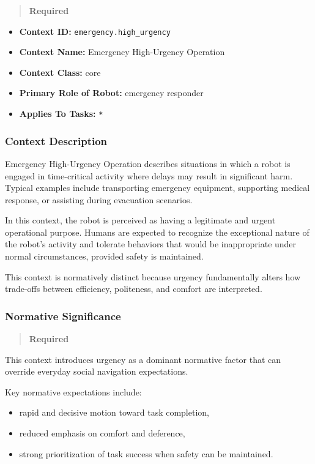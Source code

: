 \documentclass[utf8]{frontiers_suppmat} %
\providecommand{\tightlist}{%
  \setlength{\itemsep}{0pt}\setlength{\parskip}{0pt}}
\begin{document}
\begin{quote}
\textbf{Required}
\end{quote}

\begin{itemize}
\tightlist
\item
  \textbf{Context ID:} \texttt{emergency.high\_urgency}
\item
  \textbf{Context Name:} Emergency High-Urgency Operation
\item
  \textbf{Context Class:} core
\item
  \textbf{Primary Role of Robot:} emergency responder
\item
  \textbf{Applies To Tasks:} \texttt{*}
\end{itemize}

\subsubsection{Context Description}\label{context-description}

Emergency High-Urgency Operation describes situations in which a robot
is engaged in time-critical activity where delays may result in
significant harm. Typical examples include transporting emergency
equipment, supporting medical response, or assisting during evacuation
scenarios.

In this context, the robot is perceived as having a legitimate and
urgent operational purpose. Humans are expected to recognize the
exceptional nature of the robot's activity and tolerate behaviors that
would be inappropriate under normal circumstances, provided safety is
maintained.

This context is normatively distinct because urgency fundamentally
alters how trade-offs between efficiency, politeness, and comfort are
interpreted.

\subsubsection{Normative Significance}\label{normative-significance}

\begin{quote}
\textbf{Required}
\end{quote}

This context introduces urgency as a dominant normative factor that can
override everyday social navigation expectations.

Key normative expectations include:

\begin{itemize}
\tightlist
\item
  rapid and decisive motion toward task completion,
\item
  reduced emphasis on comfort and deference,
\item
  strong prioritization of task success when safety can be maintained.
\end{itemize}
\end{document}
